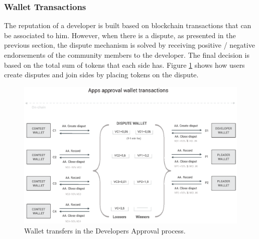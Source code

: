 \subsubsection{Wallet Transactions}

The reputation of a developer is built based on blockchain transactions that can be associated to him. However, when there is a dispute, as presented in the previous section, the dispute mechanism is solved by receiving positive / negative endorsements of the community members to the developer. The final decision is based on the total sum of tokens that each side has. Figure \ref{fig:wallet_developers_approval} shows how users create disputes and join sides by placing tokens on the dispute.

\begin{figure}[!ht]
\centering
\includegraphics[width=\textwidth]{diagrams/wallet_transfers_approval.eps}
\caption{Wallet transfers in the Developers Approval process.}
\label{fig:wallet_developers_approval}
\end{figure}










